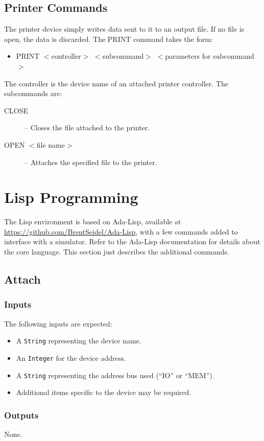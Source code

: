 \documentclass[10pt, openany]{book}
\newcommand{\datatype}[1]{\texttt{#1}}
\begin{document}
\subsection{Printer Commands}
The printer device simply writes data sent to it to an output file.
If no file is open, the data is discarded.
The PRINT command takes the form:
\begin{itemize}
  \item PRINT $<$controller$>$ $<$subcommand$>$ $<$parameters for subcommand$>$
\end{itemize}
The controller is the device name of an attached printer controller.  The subcommands are:
\begin{description}
  \item[CLOSE]  -- Closes the file attached to the printer.
  \item[OPEN  $<$file name$>$] --  Attaches the specified file to the printer.
\end{description}

\section{Lisp Programming}
The Lisp environment is based on Ada-Lisp, available at \url{https://github.com/BrentSeidel/Ada-Lisp}, with a few commands added to interface with a simulator.
Refer to the Ada-Lisp documentation for details about the core language.
This section just describes the additional commands.

\subsection{Attach}
\subsubsection{Inputs}
The following inputs are expected:
\begin{itemize}
  \item A \datatype{String} representing the device name.
  \item An \datatype{Integer} for the device address.
  \item A \datatype{String} representing the address bus used (``IO'' or ``MEM'').
  \item Additional items specific to the device may be required.
\end{itemize}
\subsubsection{Outputs}
None.
\end{document}
